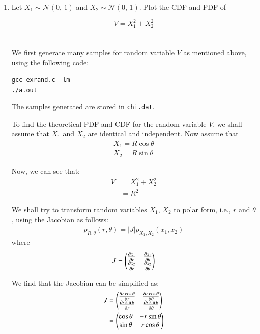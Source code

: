 \documentclass[journal,12pt,twocolumn]{IEEEtran}
\renewcommand\thesection{\arabic{section}}
\begin{document}
\begin{enumerate}[label=\thesection.\arabic*
,ref=\thesection.\theenumi]

\item Let $X_1 \sim \mathcal{N}(0,\,1)$ and $X_2 \sim \mathcal{N}(0,\,1)$. Plot the CDF and PDF of
	
	\begin{equation}
	V = X_1^2 + X_2^2
	\end{equation}
	\\
	\solution
	\\
	We first generate many samples for random variable $V$ as mentioned above, using the following code:
	\begin{lstlisting}
gcc exrand.c -lm
./a.out
	\end{lstlisting}
	The samples generated are stored in \verb|chi.dat|.

	To find the theoretical PDF and CDF for the random variable $V$, we shall assume that $X_1$ and $X_2$ are identical and independent. Now assume that
	\begin{align}
		X_1 = R \cos{\theta} \\
		X_2 = R \sin{\theta}
	\end{align}

	Now, we can see that:
	\begin{align}
		V &= X_1^2 + X_2^2 \\
		&= R^2
		\label{eq:RelationVR}
	\end{align}

	We shall try to transform random variables $X_1$, $X_2$ to polar form, i.e., $r$ and $\theta$, using the Jacobian as follows:
	\begin{align}
		p_{R,\theta}(r, \theta) = |J|p_{X_1, X_2}(x_1, x_2)
		\label{eq:Transform}
	\end{align}
	where
	\begin{align}
		J = \begin{pmatrix}\frac{\partial x_1}{\partial r}& \frac{\partial x_1}{\partial \theta} \\ \frac{\partial x_2}{\partial r} & \frac{\partial x_2}{\partial \theta}\end{pmatrix}
	\end{align}

	We find that the Jacobian can be simplified as:
	\begin{align}
		J &= \begin{pmatrix} \frac{\partial r \cos{\theta}}{\partial r} & \frac{\partial r \cos{\theta}}{\partial \theta} \\ \frac{\partial r \sin{\theta}}{\partial r} & \frac{\partial r \sin{\theta}}{\partial \theta}\end{pmatrix} \\
		&= \begin{pmatrix}\cos{\theta} & -r\sin{\theta} \\ \sin{\theta} & r\cos{\theta}\end{pmatrix} 
	\end{align}


\end{enumerate}
\end{document}
